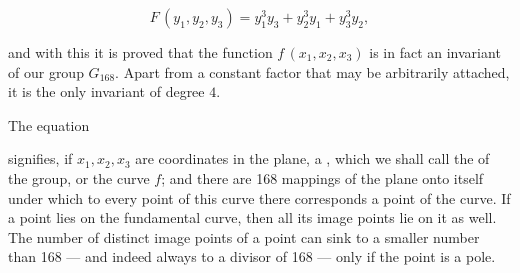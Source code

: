 \[
F\,(y_1, y_2, y_3) = y_1^3 y_3 + y_2^3 y_1 + y_3^3 y_2,
\]

and with this it is proved that the function $f\,(x_1, x_2, x_3)$ is in fact an invariant of our group $G_{168}$. Apart from a constant factor that may be arbitrarily attached, it is the only invariant of degree $4$.

The equation


signifies, if $x_1, x_2, x_3$ are coordinates in the plane, a , which we shall call the  of the group, or the curve $f$; and there are 168 mappings of the plane onto itself under which to every point of this curve there corresponds a point of the curve. If a point lies on the fundamental curve, then all its image points lie on it as well. The number of distinct image points of a point can sink to a smaller number than 168 — and indeed always to a divisor of 168 — only if the point is a pole.
